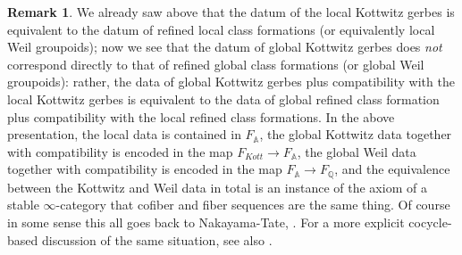 \documentclass[12pt]{article}
\theoremstyle{definition}
\newtheorem{remark}[theorem]{Remark}
\newcommand{\mbb}{\mathbb}
\begin{document}
\begin{remark}
We already saw above that the datum of the local Kottwitz gerbes is equivalent to the datum of refined local class formations (or equivalently local Weil groupoids); now we see that the datum of global Kottwitz gerbes does \emph{not} correspond directly to that of refined global class formations (or global Weil groupoids): rather, the data of global Kottwitz gerbes plus compatibility with the local Kottwitz gerbes is equivalent to the data of global refined class formation plus compatibility with the local refined class formations.  In the above presentation, the local data is contained in $F_{\mbb{A}}$, the global Kottwitz data together with compatibility is encoded in the map $F_{Kott} \to F_{\mbb{A}}$, the global Weil data together with compatibility is encoded in the map $F_{\mbb{A}} \to F_{\mbb{Q}}$, and the equivalence between the Kottwitz and Weil data in total is an instance of the axiom of a stable $\infty$-category that cofiber and fiber sequences are the same thing.  Of course in some sense this all goes back to Nakayama-Tate, \cite{tatetori}.  For a more explicit cocycle-based discussion of the same situation, see also \cite{taylorcocycles}.
\end{remark}
\end{document}
